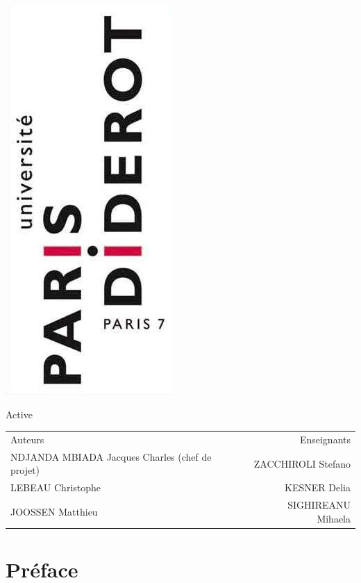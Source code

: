 \documentclass[a4paper,12pt]{report}
\begin{document}
\begin{titlepage}

\begin{flushright}
\includegraphics[scale=0.75]{"images/logo_p7"}
\end{flushright}

\selectfont
{}
\begin{center}\Huge{}\selectfont
Active
\end{center}

\begin{tabularx}{\linewidth}{lXr}
Auteurs && Enseignants\\
NDJANDA MBIADA Jacques Charles (chef de projet) && ZACCHIROLI Stefano\\
LEBEAU Christophe && KESNER Delia\\
JOOSSEN Matthieu && SIGHIREANU Mihaela
\end{tabularx}

\end{titlepage}

\chapter*{Préface}
\end{document}

